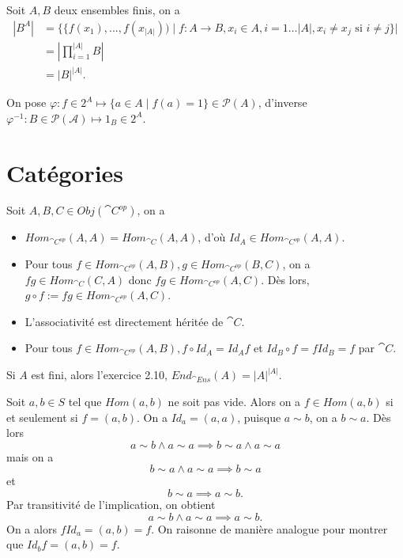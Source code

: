 \begin{exercice}
    Soit $A, B$ deux ensembles finis, on a 
    \begin{align*}
        |B^A| &= \{\{f(x_1),...,f(x_{|A|})) \mid f : A \to B, x_i \in A, i = 1\dots|A|, x_i \neq x_j \text{ si } i \neq j\}| \\
              &= \left|\prod_{i=1}^{|A|} B\right| \\
              &= |B|^{|A|}.
    \end{align*}
\end{exercice}

\begin{exercice}
    On pose $\varphi : f \in 2^A \mapsto \{a \in A \mid f(a) = 1\} \in \mathcal{P}(A)$, d'inverse $\varphi^{-1} : B \in \mathcal{P(A)} \mapsto 1_B \in 2^A$.
\end{exercice}

\section{Catégories}

\begin{exercice}
    Soit $A, B, C \in Obj(\cat{C}^{op})$, on a 
    \begin{itemize}
        \item $Hom_{\cat{C}^{op}}(A,A) = Hom_{\cat{C}}(A,A)$, d'où $Id_A \in Hom_{\cat{C}^{op}}(A,A)$.
        \item Pour tous $f \in Hom_{\cat{C}^{op}}(A,B), g \in Hom_{\cat{C}^{op}}(B,C)$, on a $fg \in Hom_{\cat{C}}(C,A)$ donc $fg \in Hom_{\cat{C}^{op}}(A,C)$.
        Dès lors, $g \circ f := fg \in Hom_{\cat{C}^{op}}(A,C)$.
        \item L'associativité est directement héritée de $\cat{C}$.
        \item Pour tous $f \in Hom_{\cat{C}^{op}}(A,B), f \circ Id_A = Id_A f$ et $Id_B \circ f = f Id_B = f$ par $\cat{C}$.
    \end{itemize}
\end{exercice}

\begin{exercice}
    Si $A$ est fini, alors l'exercice 2.10, $End_{\cat{Ens}}(A) = |A|^{|A|}$.
\end{exercice}

\begin{exercice}
    Soit $a,b \in S$ tel que $Hom(a,b)$ ne soit pas vide. Alors on a $f \in Hom(a,b)$ si et seulement si $f = (a,b)$.
    On a $Id_a = (a,a)$, puisque $a \sim b$, on a $b \sim a$. Dès lors 
    \[a \sim b \land a \sim a \implies b \sim a \land a \sim a \]
    mais on a 
    \[b \sim a \land a \sim a \implies b \sim a \]
    et 
    \[b \sim a \implies a \sim b. \]
    Par transitivité de l'implication, on obtient
    \[a \sim b \land a \sim a \implies a \sim b.\]
    On a alors $f Id_a = (a,b) = f$.
    On raisonne de manière analogue pour montrer que $Id_b f = (a,b) = f$.

\end{exercice}

